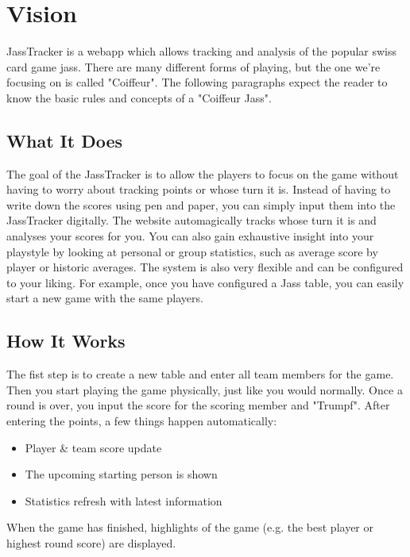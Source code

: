 \chapter{Vision}

JassTracker is a webapp which allows tracking and analysis of the popular swiss card game \gls{jass}.
There are many different forms of playing, but the one we're focusing on is called "Coiffeur".
The following paragraphs expect the reader to know the basic rules and concepts of a "Coiffeur Jass".

\section*{What It Does}
The goal of the JassTracker is to allow the players to focus on the game without having to worry about tracking points or whose turn it is.
Instead of having to write down the scores using pen and paper, you can simply input them into the JassTracker digitally.
The website automagically tracks whose turn it is and analyses your scores for you.
You can also gain exhaustive insight into your playstyle by looking at personal or group statistics, such as average score by player or historic averages.
The system is also very flexible and can be configured to your liking.
For example, once you have configured a Jass table, you can easily start a new game with the same players.

\section*{How It Works}
The fist step is to create a new table and enter all team members for the game.
Then you start playing the game physically, just like you would normally.
Once a round is over, you input the score for the scoring member and "Trumpf".
After entering the points, a few things happen automatically:
\begin{itemize}
    \item Player \& team score update
    \item The upcoming starting person is shown
    \item Statistics refresh with latest information
\end{itemize}
When the game has finished, highlights of the game (e.g. the best player or highest round score) are displayed.

